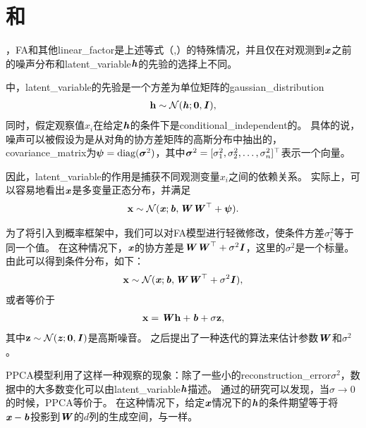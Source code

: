 \section{和}
\label{sec:probabilistic_PCA_and_factor_analysis}

，\gls{FA}和其他\gls{linear_factor}是上述等式（,）的特殊情况，并且仅在对观测到$\boldsymbol{\mathit{x}}$之前的噪声分布和\gls{latent_variable}$\boldsymbol{\mathit{h}}$的先验的选择上不同。

\citep{Bartholomew-1987,Basilevsky94}中，\gls{latent_variable}的先验是一个方差为单位矩阵的\gls{gaussian_distribution}
\begin{align}
\label{eqn:133}
\mathbf{h} \sim \mathcal{N}(\boldsymbol{\mathit{h}}; \mathbf{0},\boldsymbol{\mathit{I}}),
\end{align}
同时，假定观察值$x_i$在给定$\boldsymbol{\mathit{h}}$的条件下是\gls{conditional_independent}的。
具体的说，噪声可以被假设为是从对角的协方差矩阵的高斯分布中抽出的，\gls{covariance_matrix}为$\boldsymbol{\psi} = \text{diag}(\boldsymbol{\sigma}^2)$，其中$\boldsymbol{\sigma}^2 = [\sigma_1^2,\sigma_2^2,\ldots,\sigma_n^2]^{\top}$表示一个向量。


因此，\gls{latent_variable}的作用是捕获不同观测变量$x_i$之间的依赖关系。
实际上，可以容易地看出$\boldsymbol{\mathit{x}}$是多变量正态分布，并满足
\begin{align}
\label{eqn:134}
\mathbf{x} \sim \mathcal{N}(\boldsymbol{\mathit{x}}; \boldsymbol{\mathit{b}}, \boldsymbol{\mathit{W}}\boldsymbol{\mathit{W}}^{\top}+\boldsymbol{\psi}).
\end{align}



为了将引入到概率框架中，我们可以对\gls{FA}模型进行轻微修改，使条件方差$\sigma_i^2$等于同一个值。
在这种情况下，$\boldsymbol{\mathit{x}}$的协方差是$\boldsymbol{\mathit{W}}\boldsymbol{\mathit{W}}^{\top}+\sigma^2\boldsymbol{\mathit{I}}$，这里的$\sigma^2$是一个标量。
由此可以得到条件分布，如下：
\begin{align}
\label{eqn:135}
\mathbf{x} \sim \mathcal{N}(\boldsymbol{\mathit{x}}; \boldsymbol{\mathit{b}}, \boldsymbol{\mathit{W}}\boldsymbol{\mathit{W}}^{\top} + \sigma^2\boldsymbol{\mathit{I}} ),
\end{align}
或者等价于
\begin{align}
\label{eqn:136}
\mathbf{x} = \boldsymbol{\mathit{W}}\mathbf{h} + \boldsymbol{\mathit{b}} + \sigma\mathbf{z},
\end{align}
其中$\mathbf{z} \sim \mathcal{N}(\boldsymbol{\mathit{z}};\mathbf{0},\boldsymbol{\mathit{I}})$是高斯噪音。
之后\citet{tipping99mixtures}提出了一种迭代的算法来估计参数$\boldsymbol{\mathit{W}}$和$\sigma^2$。


\gls{PPCA}模型利用了这样一种观察的现象：除了一些小的\gls{reconstruction_error}$\sigma^2$，数据中的大多数变化可以由\gls{latent_variable}$\boldsymbol{\mathit{h}}$描述。
通过\citet{tipping99mixtures}的研究可以发现，当$\sigma \xrightarrow{} 0$的时候，\gls{PPCA}等价于。
在这种情况下，给定$\boldsymbol{\mathit{x}}$情况下的$\boldsymbol{\mathit{h}}$的条件期望等于将$\boldsymbol{\mathit{x}} - \boldsymbol{\mathit{b}}$投影到$\boldsymbol{\mathit{W}}$的$d$列的生成空间，与一样。

